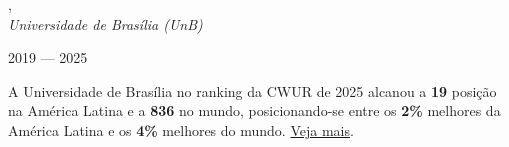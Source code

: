 , \\
\textit{Universidade de Brasília (UnB)}\strut \hfill 2019 --- 2025\\

\vspace*{7pt}


A Universidade de Brasília no ranking da CWUR de 2025 alcanou
a \textbf{19\textsuperscript{\textordmasculine}} posição na América Latina e a \textbf{836\textsuperscript{\textordmasculine}} no mundo, posicionando-se entre os \textbf{2\%} melhores da América Latina e os \textbf{4\%} melhores do mundo. \href{https://cwur.org/2025/university-of-brasilia.php}{Veja mais}.

%
%
%
